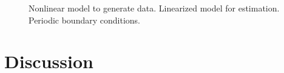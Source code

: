 \documentclass[conference,onecolumn]{IEEEtran}
\begin{document}
\begin{figure}[htbp]
	\centering
	\caption{Nonlinear model to generate data. Linearized model for estimation. Periodic boundary conditions.}
	\label{fig:label}
\end{figure}

\section{Discussion}

 
\end{document}
